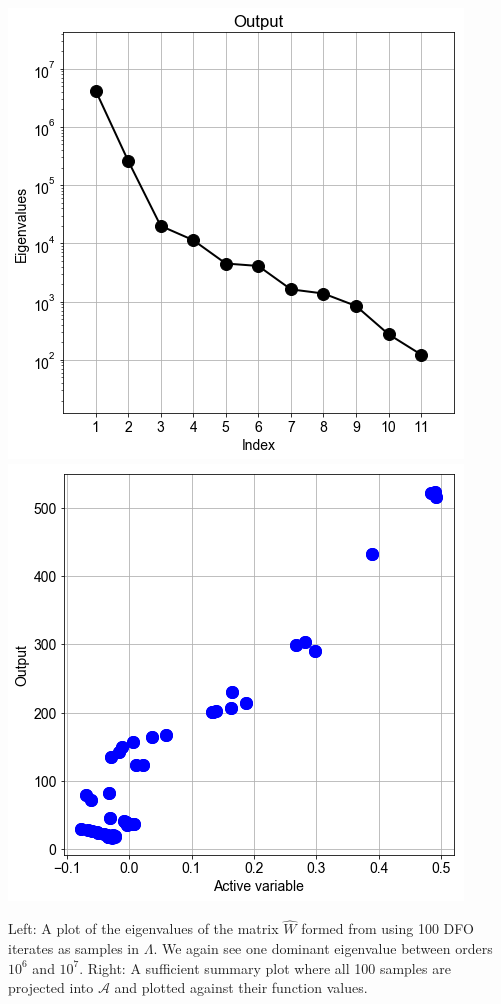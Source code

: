 \documentclass[11pt]{beamer}
\newcommand{\A}{\mathcal{A}}
\begin{document}
\begin{frame}

\begin{center}

 
\includegraphics[scale=0.3]{DFO_eigs.png} \includegraphics[scale=0.3]{DFO_suffsum.png}

Left: A plot of the eigenvalues of the matrix $\hat{W}$ formed from using 100 DFO iterates as samples in $\Lambda$. We again see one dominant eigenvalue between orders $10^6$ and $10^7$. Right: A sufficient summary plot where all 100 samples are projected into $\A$ and plotted against their function values.

\end{center}



\end{frame}
\end{document}
